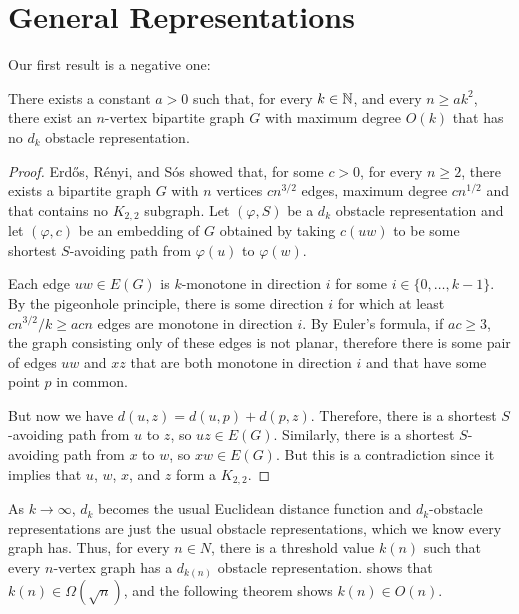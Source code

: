 \documentclass{patmorin}
\begin{document}
\section{General Representations}

Our first result is a negative one:

\begin{thm}
  There exists a constant $a>0$ such that, for every $k\in \mathbb{N}$, and every
  $n\ge ak^2$, there exist an $n$-vertex bipartite graph $G$ with maximum
  degree $O(k)$ that has no $d_k$ obstacle representation.
\end{thm}

\begin{proof}
   Erd\H{o}s, R\'enyi, and S\'os \cite{erdos.renyi.ea:1966} showed that,
   for some $c>0$, for every $n\ge 2$, there exists a bipartite graph
   $G$ with $n$ vertices $cn^{3/2}$ edges, maximum degree $cn^{1/2}$
   and that contains no $K_{2,2}$ subgraph.  Let $(\varphi,S)$ be a
   $d_k$ obstacle representation and let $(\varphi,c)$
   be an embedding of $G$ obtained by taking $c(uw)$ to be some shortest
   $S$-avoiding path from $\varphi(u)$ to $\varphi(w)$.

   Each edge $uw\in E(G)$ is $k$-monotone in direction $i$ for some
   $i\in\{0,\ldots,k-1\}$.  By the pigeonhole principle, there is
   some direction $i$ for which at least $cn^{3/2}/k\ge acn$ edges
   are monotone in direction $i$.  By Euler's formula, if $ac\ge 3$,
   the graph consisting only of these edges is not planar, therefore
   there is some pair of edges $uw$ and $xz$ that are both monotone in
   direction $i$ and that have some point $p$ in common.

   But now we have $d(u,z)=d(u,p)+d(p,z)$.  Therefore, there is a shortest
   $S$-avoiding path from $u$ to $z$, so $uz\in E(G)$.  Similarly, there
   is a shortest $S$-avoiding path from $x$ to $w$, so $xw\in E(G)$.
   But this is a contradiction since it implies that $u$, $w$, $x$,
   and $z$ form a $K_{2,2}$.
\end{proof}

As $k\to\infty$, $d_k$ becomes the usual Euclidean distance function
and $d_k$-obstacle representations are just the usual obstacle
representations, which we know every graph has.  Thus, for every $n\in
N$, there is a threshold value $k(n)$ such that every $n$-vertex graph
has a $d_{k(n)}$ obstacle representation.  
shows that $k(n)\in \Omega(\sqrt{n})$, and the following theorem shows
$k(n)\in O(n)$.
\end{document}

